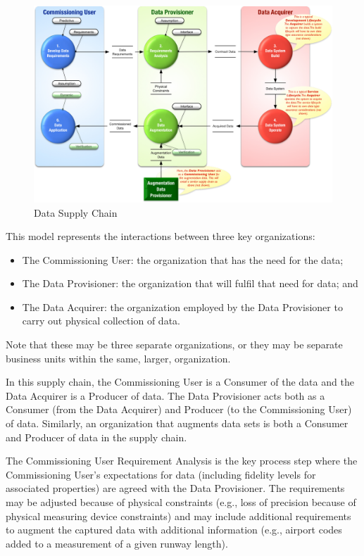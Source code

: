 \begin{figure}[htbp]
  \centering
  \includegraphics[width=\textwidth]{images/dataacquisitionlifecycleflat}
  \caption{Data Supply Chain}
  \label{fig:dataacquisitionlifecycle}
\end{figure}

This model represents the interactions between three key organizations:
\begin{itemize}
  \item The Commissioning User: the organization that has the need for the data;
  \item The Data Provisioner: the organization that will fulfil that need for data; and
  \item The Data Acquirer: the organization employed by the Data Provisioner to carry out physical collection of data.
\end{itemize}

Note that these may be three separate organizations, or they may be separate business units within the same, larger, organization.

In this supply chain, the Commissioning User is a Consumer of the data and the Data Acquirer is a Producer of data. The Data Provisioner acts both as a Consumer (from the Data Acquirer) and Producer (to the Commissioning User) of data. Similarly, an organization that augments data sets is both a Consumer and Producer of data in the supply chain.

The Commissioning User Requirement Analysis is the key process step where the Commissioning User's expectations for data (including fidelity levels for associated properties) are agreed with the Data Provisioner. The requirements may be adjusted because of physical constraints (e.g., loss of precision because of physical measuring device constraints) and may include additional requirements to augment the captured data with additional information (e.g., airport codes added to a measurement of a given runway length).

